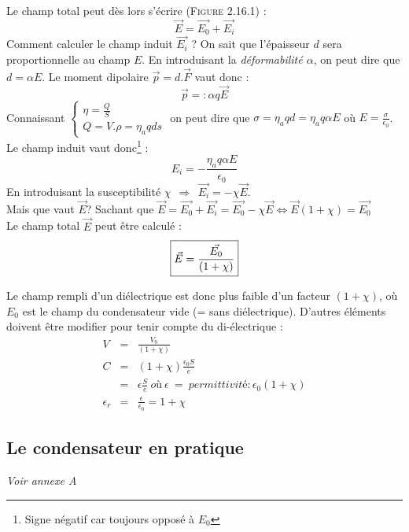 \documentclass	[11pt, a4paper, openany]{book}
\begin{document}
Le champ total peut dès lors s'écrire (\textsc{Figure 2.16.1}) :
\begin{equation}
	\vec{E} = \vec{E_0} + \vec{E_i}
\end{equation}
Comment calculer le champ induit $\vec{E_i}$ ? On sait que l'épaisseur $d$ sera proportionnelle au champ $E$. En introduisant la \textit{déformabilité $\alpha$}, on peut dire que $d = \alpha E$. Le moment dipolaire $\vec{p} = d.\vec{F}$ vaut donc :
\begin{equation}
	\vec{p} =: \alpha q\vec{E}
\end{equation}
Connaissant $\left\{\begin{array}{l}
\eta = \frac{Q}{S}\\
Q = V.\rho = \eta_a q d s
\end{array}\right.$ on peut dire que $\sigma = \eta_a q d = \eta_a q \alpha E$ où $E = \frac{\sigma}{\epsilon_0}$.
Le champ induit vaut donc\footnote{Signe négatif car toujours opposé à $E_0$} :
\begin{equation}
	E_i = -\frac{\eta_a q \alpha E}{\epsilon_0}
\end{equation}
En introduisant la susceptibilité $\chi\ \ \Rightarrow\ \ \vec{E_i} = -\chi \vec{E}$.\\
Mais que vaut $\vec{E}$? Sachant que $\vec{E} = \vec{E_0} + \vec{E_i} = \vec{E_0} - \chi \vec{E} \Leftrightarrow \vec{E}(1+\chi) = \vec{E_0}$\\
Le champ total $\vec{E}$ peut être calculé :
\begin{equation}
	\fbox{$\vec{E} = \dfrac{\vec{E_0}}{(1+\chi)}$}
\end{equation}

Le champ rempli d'un diélectrique est donc plus faible d'un facteur $(1+\chi)$, où $E_0$ est le champ du condensateur vide (= sans diélectrique). D'autres éléments doivent être modifier pour tenir compte du di-électrique :
\begin{eqnarray}
	V &=& \frac{V_0}{(1+\chi)}\\
	C &=& (1+\chi)\frac{\epsilon_0 S}{e}\\
	&=& \epsilon \frac{S}{e}\ où\ \epsilon\ =\ permittivité : \epsilon_0(1+\chi)\\
	\epsilon_r &=& \frac{\epsilon}{\epsilon_0} = 1+\chi
\end{eqnarray}

\subsection{Le condensateur en pratique}
\textit{Voir annexe A}
\end{document}
